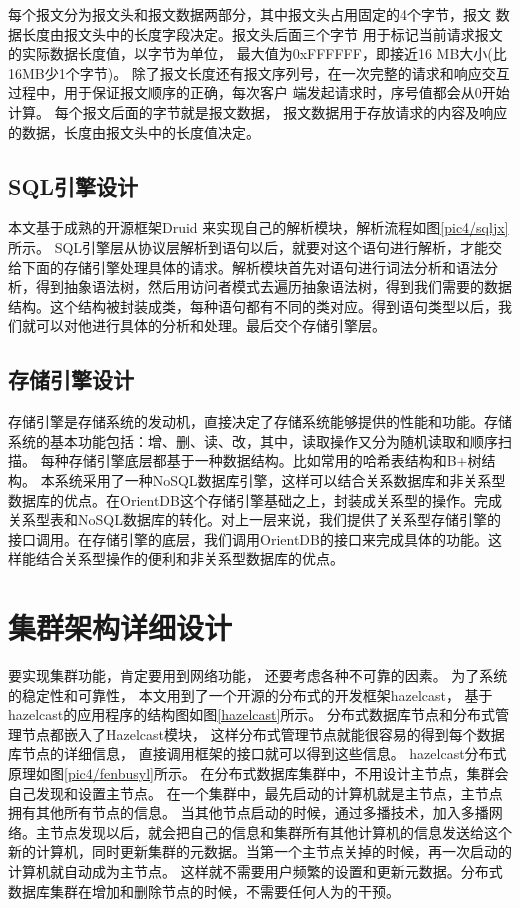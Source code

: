每个报文分为报文头和报文数据两部分，其中报文头占用固定的4个字节，报文
数据长度由报文头中的长度字段决定。报文头后面三个字节
用于标记当前请求报文的实际数据长度值，以字节为单位，
最大值为0xFFFFFF，即接近16 MB大小(比16MB少1个字节)。
除了报文长度还有报文序列号，在一次完整的请求和响应交互过程中，用于保证报文顺序的正确，每次客户
端发起请求时，序号值都会从0开始计算。
每个报文后面的字节就是报文数据，
报文数据用于存放请求的内容及响应的数据，长度由报文头中的长度值决定。
\subsection{SQL引擎设计}
本文基于成熟的开源框架Druid
来实现自己的解析模块，解析流程如图\ref{pic4/sqljx}所示。
SQL引擎层从协议层解析到语句以后，就要对这个语句进行解析，才能交给下面的存储引擎处理具体的请求。解析模块首先对语句进行词法分析和语法分析，得到抽象语法树，然后用访问者模式去遍历抽象语法树，得到我们需要的数据结构。这个结构被封装成类，每种语句都有不同的类对应。得到语句类型以后，我们就可以对他进行具体的分析和处理。最后交个存储引擎层。
\subsection{存储引擎设计}
存储引擎是存储系统的发动机，直接决定了存储系统能够提供的性能和功能。存储
系统的基本功能包括：增、删、读、改，其中，读取操作又分为随机读取和顺序扫描。
每种存储引擎底层都基于一种数据结构。比如常用的哈希表结构和B+树结构。
本系统采用了一种NoSQL数据库引擎，这样可以结合关系数据库和非关系型数据库的优点。在OrientDB这个存储引擎基础之上，封装成关系型的操作。完成关系型表和NoSQL数据库的转化。对上一层来说，我们提供了关系型存储引擎的接口调用。在存储引擎的底层，我们调用OrientDB的接口来完成具体的功能。这样能结合关系型操作的便利和非关系型数据库的优点。
\section{集群架构详细设计}
要实现集群功能，肯定要用到网络功能，
还要考虑各种不可靠的因素。
为了系统的稳定性和可靠性，
本文用到了一个开源的分布式的开发框架hazelcast，
基于hazelcast的应用程序的结构图如图\ref{hazelcast}所示。
分布式数据库节点和分布式管理节点都嵌入了Hazelcast模块，
这样分布式管理节点就能很容易的得到每个数据库节点的详细信息，
直接调用框架的接口就可以得到这些信息。
hazelcast分布式原理如图\ref{pic4/fenbusyl}所示。
在分布式数据库集群中，不用设计主节点，集群会自己发现和设置主节点。
在一个集群中，最先启动的计算机就是主节点，主节点拥有其他所有节点的信息。
当其他节点启动的时候，通过多播技术，加入多播网络。主节点发现以后，就会把自己的信息和集群所有其他计算机的信息发送给这个新的计算机，同时更新集群的元数据。当第一个主节点关掉的时候，再一次启动的计算机就自动成为主节点。
这样就不需要用户频繁的设置和更新元数据。分布式数据库集群在增加和删除节点的时候，不需要任何人为的干预。
